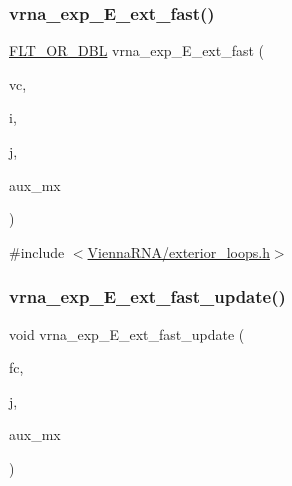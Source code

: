 \subsubsection{\texorpdfstring{vrna\+\_\+exp\+\_\+\+E\+\_\+ext\+\_\+fast()}{vrna\_exp\_E\_ext\_fast()}}
{\footnotesize\ttfamily \mbox{\hyperlink{group__data__structures_ga31125aeace516926bf7f251f759b6126}{F\+L\+T\+\_\+\+O\+R\+\_\+\+D\+BL}} vrna\+\_\+exp\+\_\+\+E\+\_\+ext\+\_\+fast (\begin{DoxyParamCaption}\item[{\mbox{\hyperlink{group__fold__compound_ga1b0cef17fd40466cef5968eaeeff6166}{vrna\+\_\+fold\+\_\+compound\+\_\+t}} $\ast$}]{vc,  }\item[{int}]{i,  }\item[{int}]{j,  }\item[{struct vrna\+\_\+mx\+\_\+pf\+\_\+aux\+\_\+el\+\_\+s $\ast$}]{aux\+\_\+mx }\end{DoxyParamCaption})}



{\ttfamily \#include $<$\mbox{\hyperlink{exterior__loops_8h}{Vienna\+R\+N\+A/exterior\+\_\+loops.\+h}}$>$}

\mbox{\label{group__loops_gaceb115e3d8855129797620b3b26882d5}} 
\subsubsection{\texorpdfstring{vrna\+\_\+exp\+\_\+\+E\+\_\+ext\+\_\+fast\+\_\+update()}{vrna\_exp\_E\_ext\_fast\_update()}}
{\footnotesize\ttfamily void vrna\+\_\+exp\+\_\+\+E\+\_\+ext\+\_\+fast\+\_\+update (\begin{DoxyParamCaption}\item[{\mbox{\hyperlink{group__fold__compound_ga1b0cef17fd40466cef5968eaeeff6166}{vrna\+\_\+fold\+\_\+compound\+\_\+t}} $\ast$}]{fc,  }\item[{int}]{j,  }\item[{struct vrna\+\_\+mx\+\_\+pf\+\_\+aux\+\_\+el\+\_\+s $\ast$}]{aux\+\_\+mx }\end{DoxyParamCaption})}



